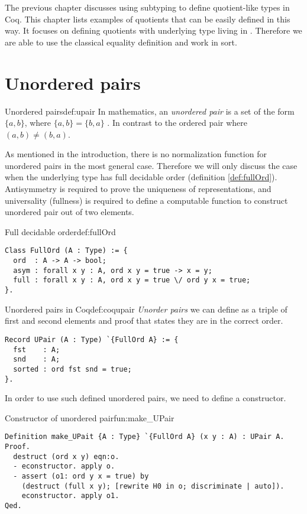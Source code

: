 The previous chapter discusses using subtyping to define quotient-like types in Coq. This chapter lists examples of quotients that can be easily defined in this way. It focuses on defining quotients with underlying type living in . Therefore we are able to use the classical equality definition and work in  sort.
\section{Unordered pairs}
\begin{defi}{Unordered pairs}{def:upair}
In mathematics, an \emph{unordered pair} is a set of the form $\{a, b\}$, where $\{a, b\} = \{b, a\}$ \cite{SetTheorey}. In contrast to the ordered pair where $(a, b) \not= (b, a)$.
\end{defi}
As mentioned in the introduction, there is no normalization function for unordered pairs in the most general case. Therefore we will only discuss the case when the underlying type has full decidable order (definition \ref{def:fullOrd}). Antisymmetry is required to prove the uniqueness of representations, and universality (fullness) is required to define a computable function to construct unordered pair out of two elements.
\begin{defi}{Full decidable order}{def:fullOrd}
\begin{verbatim}
Class FullOrd (A : Type) := {
  ord  : A -> A -> bool;
  asym : forall x y : A, ord x y = true -> x = y;
  full : forall x y : A, ord x y = true \/ ord y x = true;
}.
\end{verbatim}
\end{defi}
\begin{defi}{Unordered pairs in Coq}{def:coqupair}
\emph{Unorder pairs} we can define as a triple of first and second elements and proof that states they are in the correct order.
\begin{verbatim}
Record UPair (A : Type) `{FullOrd A} := {
  fst    : A;
  snd    : A;
  sorted : ord fst snd = true;
}.
\end{verbatim}
\end{defi}
In order to use such defined unordered pairs, we need to define a constructor.
\begin{func}{Constructor of unordered pair}{fun:make_UPair}
\begin{verbatim}
Definition make_UPait {A : Type} `{FullOrd A} (x y : A) : UPair A.
Proof.
  destruct (ord x y) eqn:o. 
  - econstructor. apply o.
  - assert (o1: ord y x = true) by
    (destruct (full x y); [rewrite H0 in o; discriminate | auto]).
    econstructor. apply o1.
Qed.
\end{verbatim}
\end{func}

